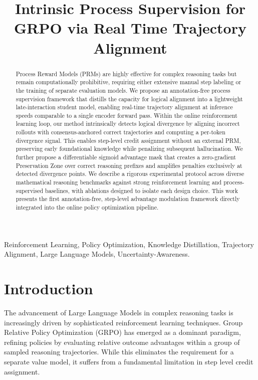 \documentclass[conference]{IEEEtran}
\begin{document}
\title{Intrinsic Process Supervision for GRPO via Real Time Trajectory Alignment}

\maketitle

\begin{abstract}
Process Reward Models (PRMs) are highly effective for complex reasoning tasks but remain computationally prohibitive, requiring either extensive manual step labeling or the training of separate evaluation models. We propose an annotation-free process supervision framework that distills the capacity for logical alignment into a lightweight late-interaction student model, enabling real-time trajectory alignment at inference speeds comparable to a single encoder forward pass. Within the online reinforcement learning loop, our method intrinsically detects logical divergence by aligning incorrect rollouts with consensus-anchored correct trajectories and computing a per-token divergence signal. This enables step-level credit assignment without an external PRM, preserving early foundational knowledge while penalizing subsequent hallucination. We further propose a differentiable sigmoid advantage mask that creates a zero-gradient Preservation Zone over correct reasoning prefixes and amplifies penalties exclusively at detected divergence points. We describe a rigorous experimental protocol across diverse mathematical reasoning benchmarks against strong reinforcement learning and process-supervised baselines, with ablations designed to isolate each design choice. This work presents the first annotation-free, step-level advantage modulation framework directly integrated into the online policy optimization pipeline.
\end{abstract}

\begin{IEEEkeywords}
Reinforcement Learning, Policy Optimization, Knowledge Distillation, Trajectory Alignment, Large Language Models, Uncertainty-Awareness.
\end{IEEEkeywords}

\section{Introduction}

The advancement of Large Language Models in complex reasoning tasks is increasingly driven by sophisticated reinforcement learning techniques. Group Relative Policy Optimization (GRPO) has emerged as a dominant paradigm, refining policies by evaluating relative outcome advantages within a group of sampled reasoning trajectories. While this eliminates the requirement for a separate value model, it suffers from a fundamental limitation in step level credit assignment.
\end{document}
